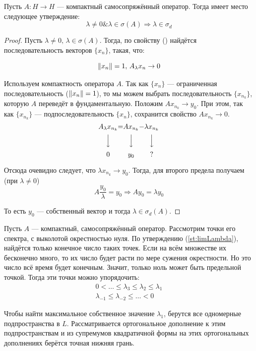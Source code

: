 \documentclass[12pt]{article}
\begin{document}
	\begin{theorem}
		Пусть $A: H \rightarrow H$ --- компактный самосопряжённый оператор. Тогда имеет место следующее утверждение:
		$$\lambda \neq 0 \& \lambda \in \sigma(A) \Rightarrow \lambda \in \sigma_d $$
	\end{theorem}
	\begin{proof}
		Пусть $\lambda \neq 0,\, \lambda \in \sigma(A)$. Тогда, по свойству (\label{eq:specCrit}) найдётся последовательность 
		векторов $\{x_n\}$, такая, что:
		
		$$\left\| x_n \right\| = 1,\, A_{\lambda}x_n \rightarrow 0$$
		
		Используем компактность оператора $A$. Так как $\{x_n\}$ --- ограниченная последовательность ($\left\| x_n \right\| = 1$), то
		мы можем выбрать последовательность $\{x_{n_k}\}$, которую $A$ переведёт в фундаментальную. 
		Положим $Ax_{n_k}\rightarrow y_0$. При этом, так как $\{x_{n_k}\}$ --- подпоследовательность $\{x_{n}\}$, 
		сохранится свойство $Ax_{n_k} \rightarrow 0$.
		$$
		\begin{CD}
			A_{\lambda}x_{n_k} @.=@. Ax_{n_k} @.-@. \lambda x_{n_k} \\
			@VVV @. @VVV @. @VVV \\
			0 @.@. y_0 @.@. ?
		\end{CD}
		$$
		
		Отсюда очевидно следует, что $\lambda x_{n_k} \rightarrow y_0$. Тогда, для второго предела получаем (при $\lambda \neq 0$)
		$$A\dfrac{y_0}{\lambda} = y_0 \Rightarrow Ay_0 = \lambda y_0$$
		
		То есть $y_0$ --- собственный вектор и тогда $\lambda \in \sigma_d(A)$.
	\end{proof}
	
	Пусть $A$ --- компактный, самосопряжённый оператор. Рассмотрим точки его спектра, с выколотой окрестностью нуля. 
	По утверждению (\ref{st:limLambda}), найдётся только конечное число таких точек. Если на всём множестве их бесконечно много, 
	то их число будет расти по мере сужения окрестности. Но это число всё время будет конечным. Значит, только ноль может быть
	предельной точкой. Тогда эти точки можно упорядочить:
	\begin{gather*}
		0 < \dots \leq \lambda_3 \leq \lambda_2 \leq \lambda_1 \\
		\lambda_{-1} \leq \lambda_{-2} \leq \dots < 0
	\end{gather*}
	
	{\color{gray}Чтобы найти максимальное собственное значение $\lambda_1$, берутся все одномерные подпространства в $L$. 
	Рассматривается ортогональное дополнение к этим подпространствам и из супремумов квадратичной формы на
	этих ортогональных дополнениях берётся точная нижняя грань.}
	
\end{document}
